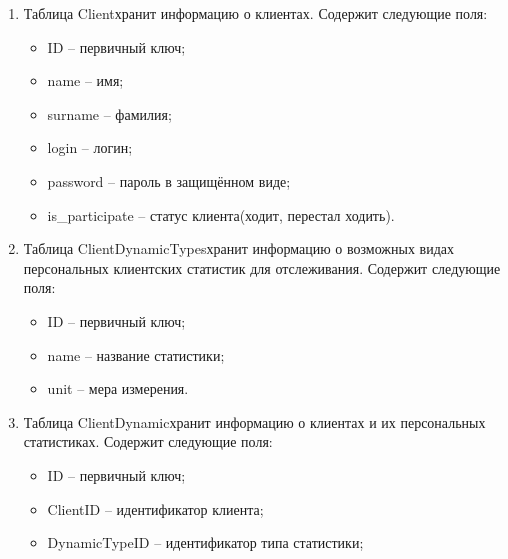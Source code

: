\begin{enumerate}
	\begin{itemize}[label=—]
		\item ID -- первичный ключ;
		\item name -- название;
		\item AdminID -- идентификатор администратора, создавшего мероприятие;
		\item CoachID -- идентификатор тренера;
		\item HallID -- идентификатор спортивного пространства;
		\item capacity -- количество мест на мероприятие;
		\item datetime -- дата и время начала мероприятия в формате ГГГГ-ММ-ДД ЧЧ:ММ:СС;
		\item duration -- продолжительность.
	\end{itemize}
	\item Таблица \guillemotleft Client\guillemotright хранит информацию о клиентах. Содержит следующие поля:
	\begin{itemize}[label=—]
		\item ID -- первичный ключ;
		\item name -- имя;
		\item surname -- фамилия;
		\item login -- логин;
		\item password -- пароль в защищённом виде;
		\item is\_participate -- статус клиента(ходит, перестал ходить).
	\end{itemize}
	\item Таблица \guillemotleft ClientDynamicTypes\guillemotright хранит информацию о возможных видах персональных клиентских статистик для отслеживания. Содержит следующие поля:
	\begin{itemize}[label=—]
		\item ID -- первичный ключ;
		\item name -- название статистики;
		\item unit -- мера измерения.
	\end{itemize}
	\item Таблица \guillemotleft ClientDynamic\guillemotright хранит информацию о клиентах и их персональных статистиках. Содержит следующие поля:
	\begin{itemize}[label=—]
		\item ID -- первичный ключ;
		\item ClientID -- идентификатор клиента;
		\item DynamicTypeID -- идентификатор типа статистики;

\end{itemize}
\end{enumerate}
